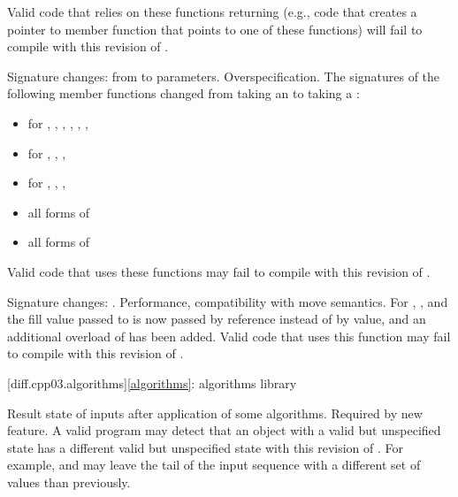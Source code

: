 Valid \CppIII{} code that relies on these functions returning 
(e.g., code that creates a pointer to member function that points to one
of these functions) will fail to compile with this revision of \Cpp{}.

\change
Signature changes: from  to 
parameters.
\rationale
Overspecification.
\effect
The signatures of the following member functions changed from taking an
 to taking a :

\begin{itemize}
\item {} for , , ,
, , , 
\item {} for , , ,
\item {} for , , , 
\item all forms of 
\item all forms of 
\end{itemize}

Valid \CppIII{} code that uses these functions may fail to compile with this
revision of \Cpp{}.

\change
Signature changes: .
\rationale
Performance, compatibility with move semantics.
\effect
For , , and 
the fill value passed to  is now passed by reference instead of
by value, and an additional overload of  has been added. Valid
\CppIII{} code that uses this function may fail to compile with this revision of \Cpp{}.

[diff.cpp03.algorithms]{\ref{algorithms}: algorithms library}

\change
Result state of inputs after application of some algorithms.
\rationale
Required by new feature.
\effect
A valid \CppIII{} program may detect that an object with a valid but
unspecified state has a different valid but unspecified state with this
revision of \Cpp{}. For example,  and
 may leave the tail of the input sequence with a
different set of values than previously.

